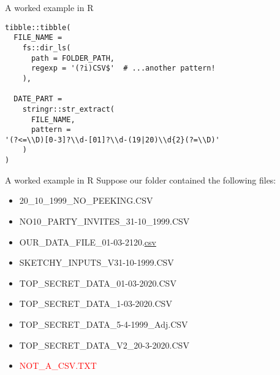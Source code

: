 \documentclass[
	usenames,
	dvipsnames,
	handout
] {beamer}
\begin{document}
\begin{frame}[fragile]{A worked example in R}
	\begin{adjustwidth}{-1.5em}{-1.5em}
		\begin{lstlisting}
tibble::tibble(
  FILE_NAME =
    fs::dir_ls(
      path = FOLDER_PATH,
      regexp = '(?i)CSV$'  # ...another pattern!
    ),
  
  DATE_PART =
    stringr::str_extract(
      FILE_NAME,
      pattern =
'(?<=\\D)[0-3]?\\d-[01]?\\d-(19|20)\\d{2}(?=\\D)'
    )
)
		\end{lstlisting}
	\end{adjustwidth}
\end{frame}

\begin{frame}{A worked example in R}
	Suppose our folder contained the following files:
	\begin{ttfamily}
		\begin{itemize}[label={}]		
			\item 20\_10\_1999\_NO\_PEEKING.CSV
			\item NO10\_PARTY\_INVITES\_31-10\_1999.CSV
			\item OUR\_DATA\_FILE\_01-03-2120.\underline{csv}
			\item SKETCHY\_INPUTS\_V31-10-1999.CSV
			\item TOP\_SECRET\_DATA\_01-03-2020.CSV
			\item TOP\_SECRET\_DATA\_1-03-2020.CSV
			\item TOP\_SECRET\_DATA\_5-4-1999\_Adj.CSV
			\item TOP\_SECRET\_DATA\_V2\_20-3-2020.CSV
			\item \textcolor{red}{NOT\_A\_CSV.TXT}
		\end{itemize}
	\end{ttfamily}
\end{frame}
		
\end{document}
